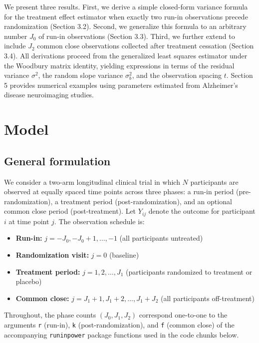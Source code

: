 \documentclass[
  11pt,
]{article}
\providecommand{\tightlist}{%
  \setlength{\itemsep}{0pt}\setlength{\parskip}{0pt}}
\begin{document}
We present three results. First, we derive a simple
closed-form variance formula for the treatment effect
estimator when exactly two run-in observations precede
randomization (Section 3.2). Second, we generalize this
formula to an arbitrary number \(J_0\) of run-in observations
(Section 3.3). Third, we further extend to include \(J_2\) common
close observations collected after treatment cessation
(Section 3.4). All derivations proceed from the generalized
least squares estimator under the Woodbury matrix identity,
yielding expressions in terms of the residual variance
\(\sigma^2\), the random slope variance \(\sigma_b^2\), and the
observation spacing \(t\). Section 5 provides numerical
examples using parameters estimated from Alzheimer's disease
neuroimaging studies.

\section{Model}\label{model}

\subsection{General formulation}\label{general-formulation}

We consider a two-arm longitudinal clinical trial in which \(N\)
participants are observed at equally spaced time points across
three phases: a run-in period (pre-randomization), a treatment
period (post-randomization), and an optional common close
period (post-treatment). Let \(Y_{ij}\) denote the outcome for
participant \(i\) at time point \(j\). The observation schedule is:

\begin{itemize}
\tightlist
\item
  \textbf{Run-in:} \(j = -J_0, -J_0+1, \ldots, -1\) (all participants
  untreated)
\item
  \textbf{Randomization visit:} \(j = 0\) (baseline)
\item
  \textbf{Treatment period:} \(j = 1, 2, \ldots, J_1\) (participants
  randomized to treatment or placebo)
\item
  \textbf{Common close:} \(j = J_1+1, J_1+2, \ldots, J_1+J_2\) (all
  participants off-treatment)
\end{itemize}

Throughout, the phase counts \((J_0, J_1, J_2)\) correspond
one-to-one to the arguments \texttt{r} (run-in), \texttt{k}
(post-randomization), and \texttt{f} (common close) of the
accompanying \texttt{runinpower} package functions used in the code
chunks below.
\end{document}
